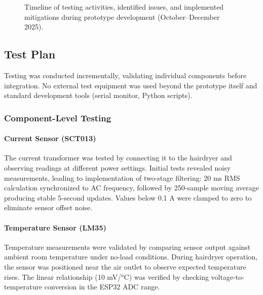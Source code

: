 \documentclass[11pt,a4paper]{article}
\begin{document}
\begin{figure}[H]
  \caption{Timeline of testing activities, identified issues, and implemented mitigations during prototype development (October--December 2025).}
  \label{fig:testing_timeline}
\end{figure}

\subsection{Test Plan}

Testing was conducted incrementally, validating individual components before integration. No external test equipment was used beyond the prototype itself and standard development tools (serial monitor, Python scripts).

\subsubsection*{Component-Level Testing}

\paragraph{Current Sensor (SCT013)}
The current transformer was tested by connecting it to the hairdryer and observing readings at different power settings. Initial tests revealed noisy measurements, leading to implementation of two-stage filtering: 20 ms RMS calculation synchronized to AC frequency, followed by 250-sample moving average producing stable 5-second updates. Values below 0.1 A were clamped to zero to eliminate sensor offset noise.

\paragraph{Temperature Sensor (LM35)}
Temperature measurements were validated by comparing sensor output against ambient room temperature under no-load conditions. During hairdryer operation, the sensor was positioned near the air outlet to observe expected temperature rises. The linear relationship (10 mV/°C) was verified by checking voltage-to-temperature conversion in the ESP32 ADC range.
\end{document}
